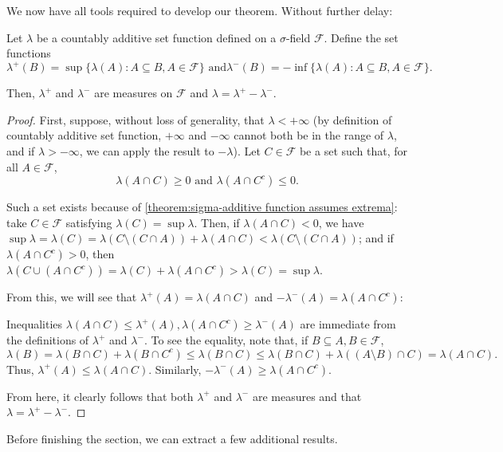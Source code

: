 We now have all tools required to develop our theorem. Without further delay:

\begin{thrm}\label{theorem:Jordan-Hahn
Decomposition} Let \(\lambda\) be a countably additive set function defined on a
\(\sigma\)-field \(\mathcal{F}\). Define the set functions
	\[ \lambda^+(B)=\sup\{\lambda(A)\colon A\subseteq B, A\in\mathcal{F}\} \text{ and
} \lambda^-(B)=-\inf\{\lambda(A)\colon A\subseteq B, A\in\mathcal{F}\}.
	\]
	
	
	Then, \(\lambda^+\) and \(\lambda^-\) are measures on \(\mathcal{F}\) and
\(\lambda=\lambda^+-\lambda^-\).
\end{thrm}
\begin{proof} First, suppose, without loss of generality, that
\(\lambda<+\infty\) (by definition of countably additive set function,
\(+\infty\) and \(-\infty\) cannot both be in the range of \(\lambda\), and if
\(\lambda>-\infty\), we can apply the result to \(-\lambda\)).  Let \(C\in\mathcal{F}\)
be a set such that, for all \(A\in\mathcal{F}\),
	\[ \lambda(A\cap C)\geq0 \text{ and } \lambda(A\cap C^c)\leq0.
	\]
	
	Such a set exists because of \cref{theorem:sigma-additive function assumes
extrema}: take \(C\in\mathcal{F}\) satisfying \(\lambda(C)=\sup\lambda\). Then, if
\(\lambda(A\cap C)<0\), we have
\(\sup\lambda=\lambda(C)=\lambda(C\setminus (C\cap A))+\lambda(A\cap C)<\lambda(C\setminus (C\cap A))\);
and if \(\lambda(A\cap C^c)>0\), then
\(\lambda(C\cup (A\cap C^c))=\lambda(C)+\lambda(A\cap C^c)>\lambda(C)=\sup\lambda\).
	
	From this, we will see that \(\lambda^+(A)=\lambda(A\cap C)\) and
\(-\lambda^-(A)=\lambda(A\cap C^c)\):
	
	Inequalities
\(\lambda(A\cap C)\leq\lambda^+(A), \lambda(A\cap C^c)\geq\lambda^-(A)\) are
immediate from the definitions of \(\lambda^+\) and \(\lambda^-\). To see the
equality, note that, if \(B\subseteq A, B\in\mathcal{F}\),
	\[ \lambda(B)=\lambda(B\cap C)+\lambda(B\cap C^c)\leq\lambda(B\cap  C)\leq\lambda(B\cap C)+\lambda((A\setminus B)\cap C)=\lambda(A\cap C).
	\] Thus, \(\lambda^+(A)\leq\lambda(A\cap C)\). Similarly,
\(-\lambda^-(A)\geq \lambda(A\cap C^c)\).
	
	From here, it clearly follows that both \(\lambda^+\) and \(\lambda^-\) are
measures and that \(\lambda=\lambda^+-\lambda^-\).
\end{proof} Before finishing the section, we can extract a few additional
results.
